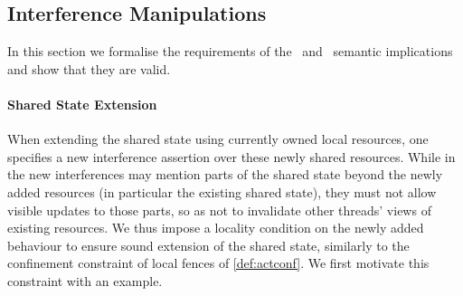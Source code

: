 %	
%
%




\subsection{Interference Manipulations}\label{subsec:extension}
In this section we formalise the requirements of the \extendRule\ and \shiftRule\ semantic implications and show that they are valid.

\paragraph{Shared State Extension}
When extending the shared state using currently owned local resources, one specifies a new interference assertion over these newly shared resources. While in \colosl the new interferences may mention parts of the shared state beyond the newly added resources (in particular the existing shared state), they must not allow visible updates to those parts, so as not to invalidate other threads' views of existing resources. We thus impose a locality condition on the newly added behaviour to ensure sound extension of the shared state, similarly to the confinement constraint of local fences of \ref{def:actconf}. We first motivate this constraint with an example.

